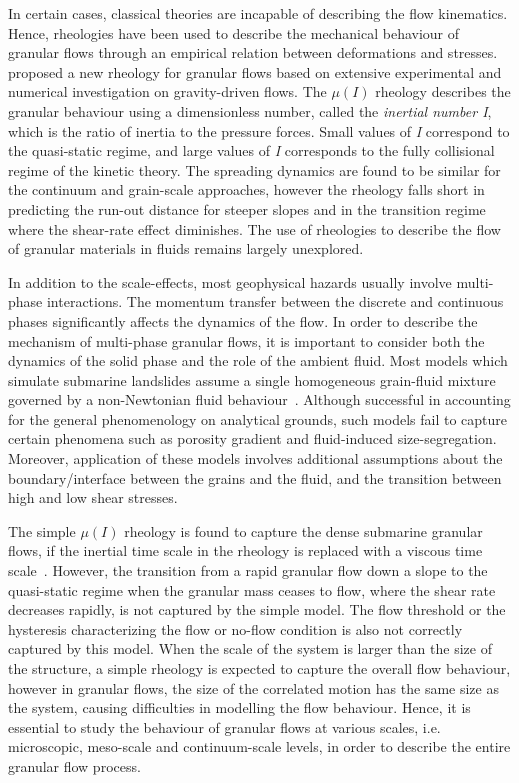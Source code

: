 In certain cases, classical theories are incapable of describing the flow 
kinematics. Hence, rheologies have been used to describe the mechanical 
behaviour of granular flows through an empirical relation between deformations 
and stresses.~\citet{Midi2004} proposed a new rheology for granular flows based 
on extensive experimental and numerical investigation on gravity-driven flows. 
The $\mu(I)$ rheology describes the granular behaviour using a dimensionless 
number, called the \textit{inertial number I}, which is the ratio of inertia to 
the pressure forces. Small values of \textit{I} correspond to the quasi-static 
regime, and large values of \textit{I} corresponds to the fully 
collisional regime of the kinetic theory. The spreading dynamics are found to 
be similar for the continuum and grain-scale approaches, however the rheology 
falls short in predicting the run-out distance for steeper slopes and in the 
transition regime where the shear-rate effect diminishes. The use of rheologies 
to describe the flow of granular materials in fluids remains largely 
unexplored.


In addition to the scale-effects, most geophysical hazards usually involve 
multi-phase interactions. The momentum transfer between the discrete and 
continuous phases significantly affects the dynamics of the flow. In order to 
describe the mechanism of multi-phase granular flows, it is important to 
consider both the dynamics of the solid phase and the role of the ambient 
fluid. Most models which simulate submarine landslides assume a single 
homogeneous grain-fluid mixture governed by a non-Newtonian fluid 
behaviour~\citep{Denlinger2001,Iverson2000}. Although successful in accounting 
for the general phenomenology on analytical grounds, such models fail to 
capture certain phenomena such as porosity gradient and fluid-induced 
size-segregation. Moreover, application of these models involves additional 
assumptions about the boundary/interface between the grains and the fluid, and 
the transition between high and low shear stresses. 

The simple $\mu(\textit{I})$ rheology is found to capture the dense submarine 
granular flows, if the inertial time scale in the rheology is replaced with a 
viscous time scale~\citep{Pouliquen2005}. However, the transition from a rapid 
granular flow down a slope to the quasi-static regime when the granular mass 
ceases to flow, where the shear rate decreases rapidly, is not captured by the 
simple model. The flow threshold or the hysteresis characterizing the flow or 
no-flow condition is also not correctly captured by this model. When the scale 
of the system is larger than the size of the structure, a simple rheology is 
expected to capture the overall flow behaviour, however in granular flows, the 
size of the correlated motion has the same size as the system, causing 
difficulties in modelling the flow behaviour. Hence, it is essential to study 
the behaviour of granular flows at various scales, i.e. microscopic, meso-scale 
and continuum-scale levels, in order to describe the entire granular flow 
process.


